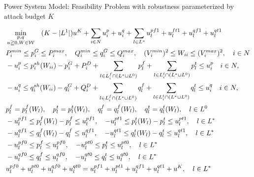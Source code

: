\documentclass[xcolor=dvipsnames]{beamer}
\newcommand{\p}[1]{p^{#1}}
\newcommand{\q}[1]{q^{#1}}
\newcommand{\ii}{i}
\newcommand{\llll}{l}
\newcommand{\from}{f}
\newcommand{\tto}{t}
\newcommand{\WW}{W}
\newcommand{\WSet}{\mathcal{W}}
\newcommand{\Lines}{L}
\begin{document}
\begin{frame}{Power System Model: Feasibility Problem with robustness parameterized by attack budget $K$}
\begin{footnotesize}
\begin{subequations}
\begin{align}
&\min_{\substack{p,q\\ u \geqq 0,W\in \WSet}} \quad 
  (K-|L^1|) u^K + \sum_{i \in N} u_i^p + u_i^q + \sum_{l \in L^*} u_l^{pf1} + u_l^{ft1} + u_l^{qf1} + u_l^{qt1}  \notag \\
  & P_i^{min} \leq p_i^G \leq P_i^{max}, \quad Q_i^{min} \leq q_i^G \leq Q_i^{max}, \quad (V_i^{min})^2 \leq W_{ii} \leq (V_i^{max})^2,\quad i\in N \notag \\
  & -u_i^p \le p_i^{sh}(\WW_{ii}) - p^G_i + P^D_i 
	+ \sum_{\llll \in \Lines_\ii^{\from} \cap (L^* \cup L^0)  } p_{l}^{f}  
	+\sum_{\llll \in \Lines_\ii^{\tto} \cap (L^* \cup L^0) } p_{l}^{t} 
	\le u_i^p \quad i\in N, \notag\\ 
  & -u_i^q \le q_i^{sh}(\WW_{ii}) - q^G_i + Q^D_i 
	+ \sum_{\llll \in \Lines_\ii^{\from} \cap (L^* \cup L^0) } q_{l}^{f}
	+ \sum_{\llll \in \Lines_\ii^{\tto} \cap (L^* \cup L^0) } q_{l}^{t} 
	\le u_i^q \quad i\in N, \notag \\
& p_{l}^{f}=\p{\from}_{\llll}(\WW_\llll),\quad p_l^t=\p{\tto}_{\llll}(\WW_\llll),\quad q_l^f=\q{\from}_{\llll}(\WW_\llll),\quad q_l^t=\q{\tto}_{\llll}(\WW_\llll) , \quad \llll \in L^0 \notag \\
& -u_l^{pf1} \le \p{\from}_{\llll}(\WW_\llll) - p_{l}^{f} \le u_l^{pf1}, \quad
 -u_l^{pt1} \le \p{\tto}_{\llll}(\WW_\llll)  - p_{l}^{t} \le u_l^{pt1}, \quad \llll \in L^* \notag \\
& -u_l^{qf1} \le \q{\from}_{\llll}(\WW_\llll) - q_{l}^{f} \le u_l^{qf1}, \quad 
 -u_l^{qt1} \le \q{\tto}_{\llll}(\WW_\llll)  - q_{l}^{t} \le u_l^{qt1}, \quad \llll \in L^* \notag \\
& -u_l^{pf0} \le p_l^f \le u_l^{pf0},\quad-u_l^{pt0} \le p_l^t \le u_l^{pt0}, \quad l \in L^* \notag\\ 
& -u_l^{qf0} \le q_l^f \le u_l^{qf0},\quad-u_l^{qt0} \le q_l^t \le u_l^{qt0}, \quad l \in L^* \notag \\
& u_l^{pf0} + u_l^{pt0} + u_l^{qf0} + u_l^{qt0} = u_l^{pf1} + u_l^{pt1} + u_l^{qf1} + u_l^{qt1} + u^K,\quad l \in L^* \notag
\end{align}
\end{subequations}
\end{footnotesize}
\end{frame}
\end{document}
